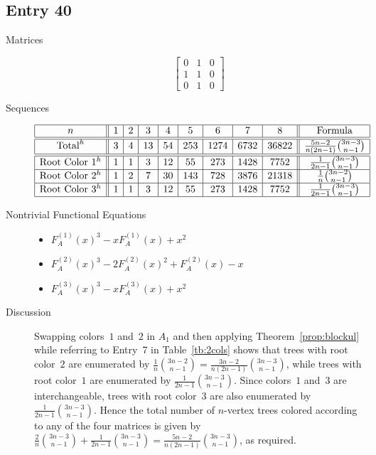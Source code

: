 \documentclass[12pt]{amsart}
\newcommand{\gff}[2]{F_{#2}^{(#1)}(x)}
\newcommand{\gfa}[1]{\gff{#1}{A}}
\begin{document}
\subsection*{Entry 40}
\begin{description}
    \item[Matrices]
    
    \[\begin{bmatrix}
0 & 1 & 0 \\
1 & 1 & 0 \\
0 & 1 & 0
\end{bmatrix}\]
    \item[Sequences]\hspace*{\fill}\vspace{-0.5cm}

    
    \begin{center}
        \[
        \begin{array}{|c||c|c|c|c|c|c|c|c||c|}\hline
           n  & 1 & 2 & 3 & 4 & 5 & 6 & 7 & 8  & \text{Formula}\\\hline\hline
           \text{Total}^{h}  & 3 & 4 & 13 & 54 & 253 & 1274 & 6732 & 36822 & \frac{5n-2}{n(2n-1)}\binom{3n-3}{n-1}\\\hline\hline
           \text{Root Color }1^h & 1 & 1 & 3 & 12 & 55 & 273 & 1428 & 7752 & \frac{1}{2n-1}\binom{3n-3}{n-1}\\\hline
           \text{Root Color }2^h & 1 & 2 & 7 & 30 & 143 & 728 & 3876 & 21318 & \frac{1}{n}\binom{3n-2}{n-1}\\\hline
           \text{Root Color }3^h & 1 & 1 & 3 & 12 & 55 & 273 & 1428 & 7752 & \frac{1}{2n-1}\binom{3n-3}{n-1}\\\hline
        \end{array}
        \]
    \end{center}
    
    \item[Nontrivial Functional Equations]\hspace*{\fill}

    \begin{itemize}
\item $\gfa{1}^3-x\gfa{1}+x^2$


\item $\gfa{2}^3-2\gfa{2}^2+\gfa{2}-x$

\item $\gfa{3}^3-x\gfa{3}+x^2$

\end{itemize}
    \item[Discussion] 
    Swapping colors~$1$ and~$2$ in $A_1$ and then applying Theorem~\ref{prop:blockul} while referring to Entry~7 in Table~\ref{tb:2cols} shows
    that trees with root color~$2$ are enumerated by $\frac{1}{n}\binom{3n-2}{n-1}=\frac{3n-2}{n(2n-1)}\binom{3n-3}{n-1}$, while trees with root color~$1$ are enumerated by $\frac{1}{2n-1}\binom{3n-3}{n-1}$. Since colors~$1$ and~$3$ are interchangeable, trees with root color~$3$ are also enumerated by $\frac{1}{2n-1}\binom{3n-3}{n-1}$.
    Hence the total number of $n$-vertex trees colored according to any of the four matrices is given by $\frac{2}{n}\binom{3n-3}{n-1}+\frac{1}{2n-1}\binom{3n-3}{n-1}=\frac{5n-2}{n(2n-1)}\binom{3n-3}{n-1}$, as required.
\end{description}
\end{document}
